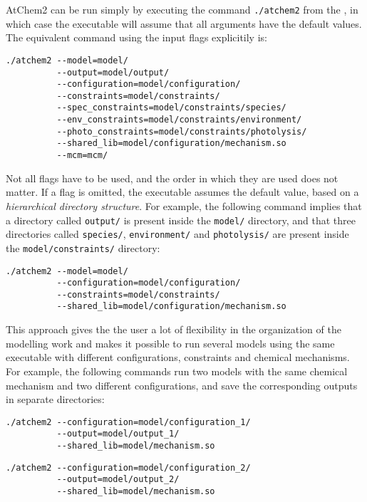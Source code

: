 AtChem2 can be run simply by executing the command \verb|./atchem2|
from the \maindir, in which case the executable will assume that all
arguments have the default values. The equivalent command using the
input flags explicitily is:

\begin{verbatim}
./atchem2 --model=model/
          --output=model/output/
          --configuration=model/configuration/
          --constraints=model/constraints/
          --spec_constraints=model/constraints/species/
          --env_constraints=model/constraints/environment/
          --photo_constraints=model/constraints/photolysis/
          --shared_lib=model/configuration/mechanism.so
          --mcm=mcm/
\end{verbatim}

Not all flags have to be used, and the order in which they are used
does not matter. If a flag is omitted, the executable assumes the
default value, based on a \emph{hierarchical directory structure}. For
example, the following command implies that a directory called
\texttt{output/} is present inside the \texttt{model/} directory, and
that three directories called \texttt{species/}, \texttt{environment/}
and \texttt{photolysis/} are present inside the
\texttt{model/constraints/} directory:

\begin{verbatim}
./atchem2 --model=model/
          --configuration=model/configuration/
          --constraints=model/constraints/
          --shared_lib=model/configuration/mechanism.so
\end{verbatim}

This approach gives the the user a lot of flexibility in the
organization of the modelling work and makes it possible to run
several models using the same executable with different
configurations, constraints and chemical mechanisms. For example, the
following commands run two models with the same chemical mechanism and
two different configurations, and save the corresponding outputs in
separate directories:

\begin{verbatim}
./atchem2 --configuration=model/configuration_1/
          --output=model/output_1/
          --shared_lib=model/mechanism.so
\end{verbatim}

\begin{verbatim}
./atchem2 --configuration=model/configuration_2/
          --output=model/output_2/
          --shared_lib=model/mechanism.so
\end{verbatim}

